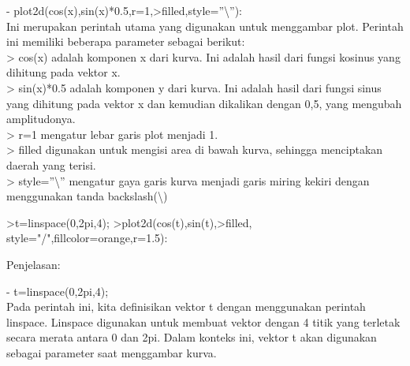 \documentclass{article}
\begin{document}
\begin{eulernotebook}
\begin{eulercomment}
- plot2d(cos(x),sin(x)*0.5,r=1,\textgreater{}filled,style=”\textbackslash{}”):\\
Ini merupakan perintah utama yang digunakan untuk menggambar plot.
Perintah ini memiliki beberapa parameter sebagai berikut:\\
\textgreater{} cos(x) adalah komponen x dari kurva. Ini adalah hasil dari fungsi
kosinus yang dihitung pada vektor x.\\
\textgreater{} sin(x)*0.5 adalah komponen y dari kurva. Ini adalah hasil dari
fungsi sinus yang dihitung pada vektor x dan kemudian dikalikan dengan
0,5, yang mengubah amplitudonya.\\
\textgreater{} r=1 mengatur lebar garis plot menjadi 1.\\
\textgreater{} filled digunakan untuk mengisi area di bawah kurva, sehingga
menciptakan daerah yang terisi.\\
\textgreater{} style=”\textbackslash{}” mengatur gaya garis kurva menjadi garis miring kekiri
dengan menggunakan tanda backslash(\textbackslash{})
\end{eulercomment}
\begin{eulerprompt}
>t=linspace(0,2pi,4);
>plot2d(cos(t),sin(t),>filled, style="/",fillcolor=orange,r=1.5):
\end{eulerprompt}
\begin{eulercomment}
Penjelasan:

- t=linspace(0,2pi,4);\\
Pada perintah ini, kita definisikan vektor t dengan menggunakan
perintah linspace. Linspace digunakan untuk membuat vektor dengan 4
titik yang terletak secara merata antara 0 dan 2pi. Dalam konteks ini,
vektor t akan digunakan sebagai parameter saat menggambar kurva.


\end{eulercomment}
\end{eulernotebook}
\end{document}
